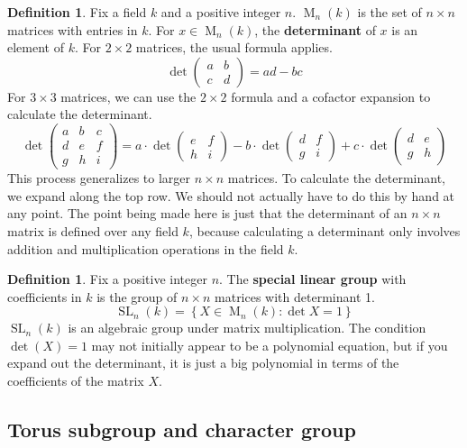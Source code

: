 \documentclass[12pt]{article}
\theoremstyle{definition}
\newtheorem{definition}[theorem]{Definition}
\newcommand{\lb}{\left\{}
\newcommand{\rb}{\right\}}
\newcommand{\tbf}{\textbf}
\DeclareMathOperator{\M}{M}
\DeclareMathOperator{\SL}{SL}
\begin{document}
\begin{definition}
Fix a field $k$ and a positive integer $n$. $\M_n(k)$ is the set of $n \times n$ matrices with entries in $k$. For $x \in \M_n(k)$, the \tbf{determinant} of $x$ is an element of $k$. For $2 \times 2$ matrices, the usual formula applies.
\[
	\det
	\begin{pmatrix}
		a & b \\
		c & d
	\end{pmatrix}
	= ad - bc
\]
For $3 \times 3$ matrices, we can use the $2 \times 2$ formula and a cofactor expansion to calculate the determinant.
\[
	\det
	\begin{pmatrix}
		a & b & c \\
		d & e & f \\
		g & h & i
	\end{pmatrix}
	= a \cdot \det
	\begin{pmatrix}
		e & f \\
		h & i
	\end{pmatrix}
	-
	b \cdot \det
	\begin{pmatrix}
		d & f \\
		g & i
	\end{pmatrix}
	+ c  \cdot \det
	\begin{pmatrix}
		d & e \\
		g & h
	\end{pmatrix}
\]
This process generalizes to larger $n \times n$ matrices. To calculate the determinant, we expand along the top row. We should not actually have to do this by hand at any point. The point being made here is just that the determinant of an $n \times n$ matrix is defined over any field $k$, because calculating a determinant only involves addition and multiplication operations in the field $k$.
\end{definition}

\begin{definition}
Fix a positive integer $n$. The \tbf{special linear group} with coefficients in $k$ is the group of $n \times n$ matrices with determinant 1.
\[
	\SL_n(k) = \lb X \in \M_n(k) : \det X = 1 \rb
\]
$\SL_n(k)$ is an algebraic group under matrix multiplication. The condition $\det(X) = 1$ may not initially appear to be a polynomial equation, but if you expand out the determinant, it is just a big polynomial in terms of the coefficients of the matrix $X$.
\end{definition}

\subsection{Torus subgroup and character group}
\end{document}
